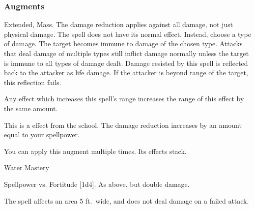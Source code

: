 \subsubsection{Augments}
 Extended, Mass.
The damage reduction applies against all damage, not just physical damage.
The spell does not have its normal effect.
Instead, choose a type of damage.
The target becomes immune to damage of the chosen type.
Attacks that deal damage of multiple types still inflict damage normally unless the target is immune to all types of damage dealt.
Damage resisted by this spell is reflected back to the attacker as life damage.
If the attacker is beyond \rngclose range of the target, this reflection fails.
\par Any effect which increases this spell's range increases the range of this effect by the same amount.
\par
This is a  effect from the  school.
The damage reduction increases by an amount equal to your spellpower.
\par
You can apply this augment multiple times.
Its effects stack.
\begin{spellsection}{Water Mastery}
\begin{spellheader}
\end{spellheader}
\begin{spellcontent}
\begin{spelltargetinginfo}
\end{spelltargetinginfo}
\begin{spelleffects}
\begin{spellattack}{Spellpower vs. Fortitude}
\spellsuccess {}[1d4].
\spellcritical As above, but double damage.
\end{spellattack}
\end{spelleffects}
\end{spellcontent}
\begin{spellfooter}
\miscastexplode
\end{spellfooter}
\begin{spellcantrip}
The spell affects an area 5 ft.\ wide, and does not deal damage on a failed attack.
\end{spellcantrip}
\end{spellsection}
